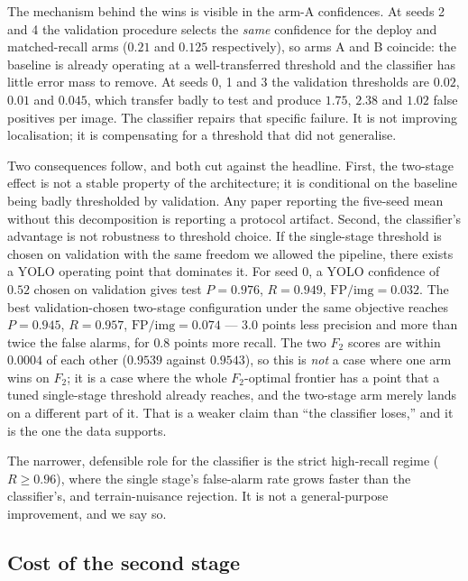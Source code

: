 The mechanism behind the wins is visible in the arm-A confidences. At seeds 2 and
4 the validation procedure selects the \emph{same} confidence for the deploy and
matched-recall arms ($0.21$ and $0.125$ respectively), so arms A and B coincide:
the baseline is already operating at a well-transferred threshold and the
classifier has little error mass to remove. At seeds 0, 1 and 3 the validation
thresholds are $0.02$, $0.01$ and $0.045$, which transfer badly to test and
produce $1.75$, $2.38$ and $1.02$ false positives per image. The classifier
repairs that specific failure. It is not improving localisation; it is
compensating for a threshold that did not generalise.

Two consequences follow, and both cut against the headline. First, the two-stage
effect is not a stable property of the architecture; it is conditional on the
baseline being badly thresholded by validation. Any paper reporting the five-seed
mean without this decomposition is reporting a protocol artifact. Second, the
classifier's advantage is not robustness to threshold choice. If the single-stage
threshold is chosen on validation with the same freedom we allowed the pipeline,
there exists a YOLO operating point that dominates it. For seed 0, a YOLO
confidence of $0.52$ chosen on validation gives test $P = 0.976$, $R = 0.949$,
$\mathrm{FP/img} = 0.032$. The best validation-chosen two-stage configuration
under the same objective reaches $P = 0.945$, $R = 0.957$,
$\mathrm{FP/img} = 0.074$ --- $3.0$ points less precision and more than twice the
false alarms, for $0.8$ points more recall. The two $F_2$ scores are within
$0.0004$ of each other ($0.9539$ against $0.9543$), so this is \emph{not} a case
where one arm wins on $F_2$; it is a case where the whole $F_2$-optimal frontier
has a point that a tuned single-stage threshold already reaches, and the two-stage
arm merely lands on a different part of it. That is a weaker claim than ``the
classifier loses,'' and it is the one the data supports.

The narrower, defensible role for the classifier is the strict high-recall regime
($R \ge 0.96$), where the single stage's false-alarm rate grows faster than the
classifier's, and terrain-nuisance rejection. It is not a general-purpose
improvement, and we say so.

\subsection{Cost of the second stage}
\label{sec:cost}


